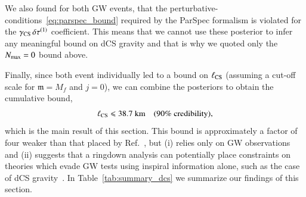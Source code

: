 \documentclass[twocolumn,
               prd,
               aps,
               superscriptaddress,
               tightenlines,
               nofootinbib,
               eqsecnum,
               amsfonts,
               amsmath,
               longbibliography]{revtex4-1}
\newcommand{\gm}{\mathfrak{m}}
\begin{document}
We also found for both GW events, that the
perturbative-conditions~\eqref{eq:parspec_bound} required by the ParSpec
formalism is violated for the $\gamma_{\rm CS} \, \delta \tau^{(1)}$ coefficient.
%
This means that we cannot use these posterior to infer any meaningful bound on dCS gravity
and that is why we quoted only the $N_{\rm max}=0$ bound above.

Finally, since both event individually led to a bound on $\ell_{\rm CS}$
(assuming a cut-off scale for $\gm = M_{f}$ and $j = 0$), we can combine the
posteriors to obtain the cumulative bound,
%
\begin{equation}
\ell_{\rm CS} \leqslant 38.7~\textrm{km}
\quad \textrm{(90\% credibility)},
\end{equation}
%
which is the main result of this section.
%
This bound is approximately a factor of four weaker than that placed by
Ref.~\cite{Silva:2020acr}, but
%
(i) relies only on GW observations and
%
(ii) suggests that a ringdown analysis can potentially place constraints on
theories which evade GW tests using inspiral information alone, such as the
case of dCS gravity~\cite{Nair:2019iur,Perkins:2021mhb,Lyu:2022gdr}.
%
In Table~\ref{tab:summary_dcs} we summarize our findings of this section.
\end{document}
